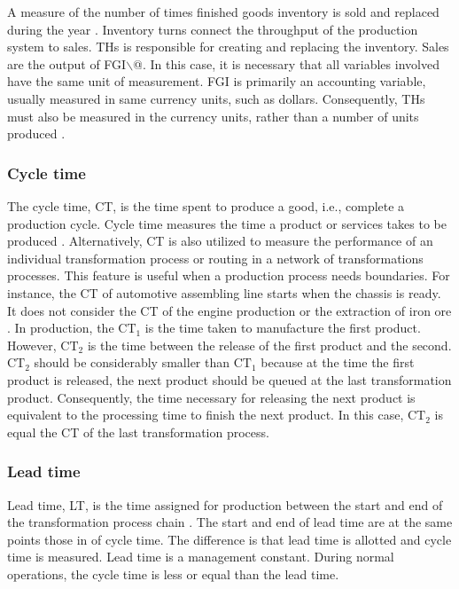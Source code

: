 \documentclass{article}
\begin{document}
A measure of the number of times finished goods inventory is sold and replaced during the year \citep{Marshall2014}.
Inventory turns connect the throughput of the production system to sales.
THs is responsible for creating and replacing the inventory.
Sales are the output of FGI$\backslash$@.
In this case, it is necessary that all variables involved have the same unit of measurement.
FGI is primarily an accounting variable, usually measured in same currency units, such as dollars.
Consequently,
THs must also be measured in the currency units, rather than a number of units produced \citep{Hopp2001}.

\subsubsection{Cycle time}
\label{sec:orgc6b5cc9}

The cycle time, CT, is the time spent to produce a good, i.e., complete a production cycle.
Cycle time measures the time a product or services takes to be produced \citep{Hopp2001}.
Alternatively, CT is also utilized to measure the performance of an individual transformation process or routing in a network of transformations processes.
This feature is useful when a production process needs boundaries.
For instance, the CT of automotive assembling line starts when the chassis is ready.
It does not consider the CT of the engine production or the extraction of iron ore \citep{Hopp2001}.
In production, the \(\mbox{CT}_1\) is the time taken to manufacture the first product.
However, \(\mbox{CT}_2\) is the time between the release of the first product and the second.
\(\mbox{CT}_2\) should be considerably smaller than \(\mbox{CT}_1\) because at the time the first product is released, the next product should be queued at the last transformation product.
Consequently, the time necessary for releasing the next product is equivalent to the processing time to finish the next product.
In this case, \(\mbox{CT}_2\) is equal the CT of the last transformation process.

\subsubsection{Lead time}
\label{sec:org15be008}

Lead time, LT, is the time assigned for production between the start and end of the transformation process chain \citep{Hopp2001}.
The start and end of lead time are at the same points those in of cycle time.
The difference is that lead time is allotted and cycle time is measured.
Lead time is a management constant.
During normal operations, the cycle time is less or equal than the lead time.
\end{document}
